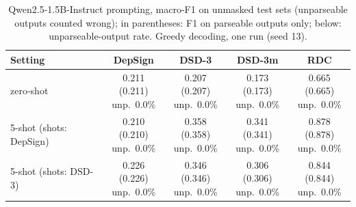 \begin{table}[t]
\centering
\caption{Qwen2.5-1.5B-Instruct prompting, macro-F1 on unmasked test sets (unparseable outputs counted wrong); in parentheses: F1 on parseable outputs only; below: unparseable-output rate. Greedy decoding, one run (seed 13).}
\label{tab:llm}
\scriptsize
\setlength{\tabcolsep}{3pt}
\begin{tabular}{lcccc}
\toprule
Setting & DepSign & DSD-3 & DSD-3m & RDC \\
\midrule
zero-shot & \shortstack{0.211 (0.211)\\[-1pt]\tiny unp.\ 0.0\%} & \shortstack{0.207 (0.207)\\[-1pt]\tiny unp.\ 0.0\%} & \shortstack{0.173 (0.173)\\[-1pt]\tiny unp.\ 0.0\%} & \shortstack{0.665 (0.665)\\[-1pt]\tiny unp.\ 0.0\%} \\
5-shot (shots: DepSign) & \shortstack{0.210 (0.210)\\[-1pt]\tiny unp.\ 0.0\%} & \shortstack{0.358 (0.358)\\[-1pt]\tiny unp.\ 0.0\%} & \shortstack{0.341 (0.341)\\[-1pt]\tiny unp.\ 0.0\%} & \shortstack{0.878 (0.878)\\[-1pt]\tiny unp.\ 0.0\%} \\
5-shot (shots: DSD-3) & \shortstack{0.226 (0.226)\\[-1pt]\tiny unp.\ 0.0\%} & \shortstack{0.346 (0.346)\\[-1pt]\tiny unp.\ 0.0\%} & \shortstack{0.306 (0.306)\\[-1pt]\tiny unp.\ 0.0\%} & \shortstack{0.844 (0.844)\\[-1pt]\tiny unp.\ 0.0\%} \\
\bottomrule
\end{tabular}
\end{table}
